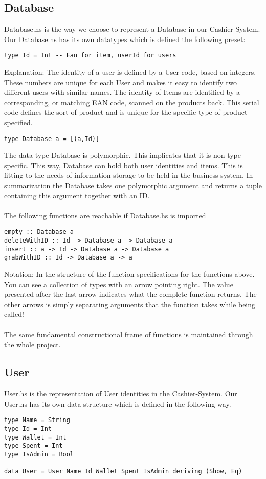 \documentclass[11pt]{article}
\begin{document}
\subsection{Database}
Database.hs is the way we choose to represent a Database in our Cashier-System. Our Database.hs has its own datatypes which is defined the following preset:
\begin{lstlisting}
type Id = Int -- Ean for item, userId for users
\end{lstlisting}

Explanation: The identity of a user is defined by a User code, based on integers. These numbers are unique for each User and makes  it easy to identify two different users with similar names.
The identity of Items are identified by a corresponding, or matching EAN code, scanned on the products back. This serial code defines the sort of product and is unique for the specific type of product specified.
\begin{lstlisting}
type Database a = [(a,Id)]
\end{lstlisting}

The data type Database is polymorphic. This implicates that it is non type specific.  This way, Database can hold both user identities and items. This is fitting to the needs of information storage to be held in the business system. In summarization the Database takes one polymorphic argument and returns a tuple containing this argument together with an ID.\\\\
The following functions are reachable if Database.hs is imported
\begin{lstlisting}
empty :: Database a
deleteWithID :: Id -> Database a -> Database a
insert :: a -> Id -> Database a -> Database a
grabWithID :: Id -> Database a -> a
\end{lstlisting}

Notation: In the structure of the function specifications for the functions above. You can see a collection of types with an arrow pointing right. The value presented after the last arrow indicates what the complete function returns. The other arrows is simply separating arguments that the function takes while being called!\\\\
The same fundamental constructional frame of functions is maintained through the whole project.
\pagebreak
\subsection{User}
User.hs is the representation of User identities in the Cashier-System. Our User.hs has its own data structure which is defined in the following way.
\begin{lstlisting}
type Name = String
type Id = Int
type Wallet = Int
type Spent = Int
type IsAdmin = Bool

data User = User Name Id Wallet Spent IsAdmin deriving (Show, Eq)
\end{lstlisting}
\end{document}
